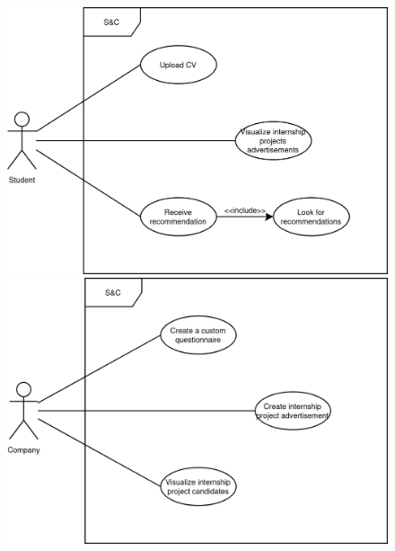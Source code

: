\begin{figure}[H]
    \centering
    \begin{minipage}{0.3\textwidth}
        \centering
        \includegraphics[width=\linewidth]{../../assets/use-case-diagrams/student-unique.png}
    \end{minipage}
    \hspace{1in}
    \begin{minipage}{0.3\textwidth}
        \centering
        \includegraphics[width=\linewidth]{../../assets/use-case-diagrams/company-unique.png}
    \end{minipage}
\end{figure}

